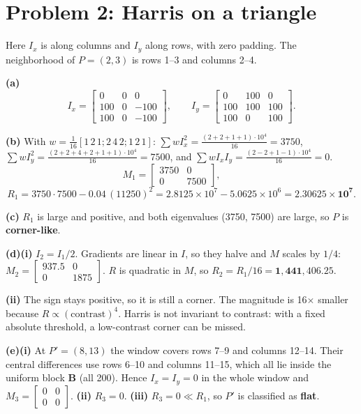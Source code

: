 \documentclass[11pt]{article}
\begin{document}
\section*{Problem 2: Harris on a triangle}

Here $I_x$ is along columns and $I_y$ along rows, with zero padding. The neighborhood of $P=(2,3)$ is rows 1--3 and columns 2--4.

\textbf{(a)}
\[
I_x=\begin{bmatrix}0&0&0\\100&0&-100\\100&0&-100\end{bmatrix},\qquad
I_y=\begin{bmatrix}0&100&0\\100&100&100\\100&0&100\end{bmatrix}.
\]

\textbf{(b)} With $w=\frac1{16}[1\,2\,1;2\,4\,2;1\,2\,1]$:
$\sum wI_x^2=\frac{(2+2+1+1)\cdot10^4}{16}=3750$, $\sum wI_y^2=\frac{(2+2+4+2+1+1)\cdot10^4}{16}=7500$, and
$\sum wI_xI_y=\frac{(2-2+1-1)\cdot10^4}{16}=0$.
\[
M_1=\begin{bmatrix}3750&0\\0&7500\end{bmatrix},\qquad
\]
\[
R_1=3750\cdot7500-0.04\,(11250)^2=2.8125\times10^7-5.0625\times10^6=\mathbf{2.30625\times10^7}.
\]

\textbf{(c)} $R_1$ is large and positive, and both eigenvalues (3750, 7500) are large, so $P$ is \textbf{corner-like}.

\textbf{(d)(i)} $I_2=I_1/2$. Gradients are linear in $I$, so they halve and $M$ scales by $1/4$:
$M_2=\begin{bmatrix}937.5&0\\0&1875\end{bmatrix}$. $R$ is quadratic in $M$, so
$R_2=R_1/16=\mathbf{1{,}441{,}406.25}$.

\textbf{(ii)} The sign stays positive, so it is still a corner. The magnitude is 16$\times$ smaller because $R\propto(\text{contrast})^4$. Harris is not invariant to contrast: with a fixed absolute threshold, a low-contrast corner can be missed.

\textbf{(e)(i)} At $P'=(8,13)$ the window covers rows 7--9 and columns 12--14. Their central differences use rows 6--10 and columns 11--15, which all lie inside the uniform block $\mathbf B$ (all 200). Hence $I_x=I_y=0$ in the whole window and
$M_3=\begin{bmatrix}0&0\\0&0\end{bmatrix}$.
\textbf{(ii)} $R_3=0$.
\textbf{(iii)} $R_3=0\ll R_1$, so $P'$ is classified as \textbf{flat}.
\end{document}
